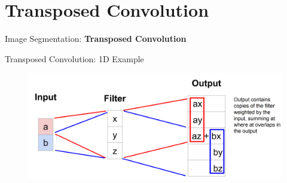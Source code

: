 \section{Transposed Convolution}
\begin{frame}{}
    \LARGE Image Segmentation: \textbf{Transposed Convolution}
\end{frame}

\begin{frame}{Transposed Convolution: 1D Example}
    \begin{figure}
        \centering
        \includegraphics[width=1.0\textwidth,height=1.0\textheight,keepaspectratio]{images/segmentation/upsample_9.png}
    \end{figure}
\end{frame}